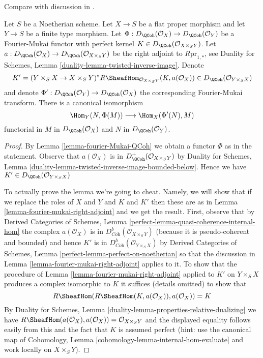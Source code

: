 \begin{lemma}
\label{lemma-fourier-mukai-left-adjoint}
\begin{reference}
Compare with discussion in \cite{Rizzardo}.
\end{reference}
Let $S$ be a Noetherian scheme. Let $X \to S$ be a flat proper
morphism and let $Y \to S$ be a finite type morphism. Let
$\Phi : D_\QCoh(\mathcal{O}_X) \to D_\QCoh(\mathcal{O}_Y)$
be a Fourier-Mukai functor with perfect kernel
$K \in D_\QCoh(\mathcal{O}_{X \times_S Y})$.
Let $a : D_\QCoh(\mathcal{O}_X) \to  D_\QCoh(\mathcal{O}_{X \times_S Y})$
be the right adjoint to $R\text{pr}_{1, *}$, see
Duality for Schemes, Lemma \ref{duality-lemma-twisted-inverse-image}.
Denote
$$
K' = (Y \times_S X \to X \times_S Y)^*
R\SheafHom_{\mathcal{O}_{X \times_S Y}}(K, a(\mathcal{O}_X)) \in
D_\QCoh(\mathcal{O}_{Y \times_S X})
$$
and denote $\Phi' : D_\QCoh(\mathcal{O}_Y) \to D_\QCoh(\mathcal{O}_X)$
the corresponding Fourier-Mukai transform. There is a canonical
isomorphism
$$
\Hom_Y(N, \Phi(M)) \longrightarrow \Hom_X(\Phi'(N), M)
$$
functorial in $M$ in $D_\QCoh(\mathcal{O}_X)$ and $N$ in
$D_\QCoh(\mathcal{O}_Y)$.
\end{lemma}

\begin{proof}
By Lemma \ref{lemma-fourier-Mukai-QCoh} we obtain a functor $\Phi$
as in the statement. Observe that $a(\mathcal{O}_X)$ is in
$D^+_\QCoh(\mathcal{O}_{X \times_S Y})$ by Duality for Schemes,
Lemma \ref{duality-lemma-twisted-inverse-image-bounded-below}.
Hence we have $K' \in D_\QCoh(\mathcal{O}_{Y \times_S X})$

\medskip\noindent
To actually prove the lemma we're going to cheat. Namely, we will
show that if we replace the roles of $X$ and $Y$ and $K$ and $K'$
then these are as in Lemma \ref{lemma-fourier-mukai-right-adjoint}
and we get the result. First, observe that by
Derived Categories of Schemes, Lemma
\ref{perfect-lemma-quasi-coherence-internal-hom}
the complex $a(\mathcal{O}_X)$ is in
$D^b_{\textit{Coh}}(\mathcal{O}_{X \times_S Y})$
(because it is pseudo-coherent and bounded) and
hence $K'$ is in $D^b_{\textit{Coh}}(\mathcal{O}_{Y \times_S X})$
by Derived Categories of Schemes, Lemma
\ref{perfect-lemma-perfect-on-noetherian}
so that the discussion in Lemma \ref{lemma-fourier-mukai-right-adjoint}
applies to it. To show that the procedure of
Lemma \ref{lemma-fourier-mukai-right-adjoint} applied to $K'$ on $Y \times_S X$
produces a complex isomorphic to $K$ it suffices
(details omitted) to show that
$$
R\SheafHom(R\SheafHom(K, a(\mathcal{O}_X)), a(\mathcal{O}_X)) = K
$$
By Duality for Schemes, Lemma \ref{duality-lemma-properties-relative-dualizing}
we have $R\SheafHom(a(\mathcal{O}_X), a(\mathcal{O}_X)) =
\mathcal{O}_{X \times_S Y}$ and the displayed equality follows easily
from this and the fact that $K$ is assumed perfect (hint: use the
canonical map of
Cohomology, Lemma \ref{cohomology-lemma-internal-hom-evaluate} and work
locally on $X \times_S Y$).
\end{proof}

